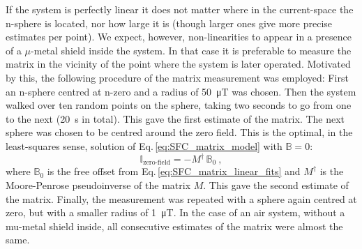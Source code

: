 If the system is perfectly linear it does not matter where in the current-space the n-sphere is located, nor how large it is (though larger ones give more precise estimates per point). We expect, however, non-linearities to appear in a presence of a $\mu$-metal shield inside the system.
In that case it is preferable to measure the matrix in the vicinity of the point where the system is later operated. Motivated by this, the following procedure of the matrix measurement was employed: First an n-sphere centred at n-zero and a radius of \SI{50}{\micro\tesla} was chosen. Then the system walked over ten random points on the sphere, taking two seconds to go from one to the next (\SI{20}{\second} in total).
This gave the first estimate of the matrix. The next sphere was chosen to be centred around the zero field. This is the optimal, in the least-squares sense, solution of Eq.\,\ref{eq:SFC_matrix_model} with $\mathbb{B} = 0$:
\begin{equation}
  \label{eq:SFC_zero_field_requirement}
  \mathbb{I}_\text{zero-field} = - M^\dagger \, \mathbb{B}_0 \ ,
\end{equation}
where $\mathbb{B}_0$ is the free offset from Eq.\,\ref{eq:SFC_matrix_linear_fits} and $M^\dagger$ is the Moore-Penrose pseudoinverse of the matrix $M$. This gave the second estimate of the matrix. Finally, the measurement was repeated with a sphere again centred at zero, but with a smaller radius of \SI{1}{\micro\tesla}.
In the case of an air system, without a mu-metal shield inside, all consecutive estimates of the matrix were almost the same.

